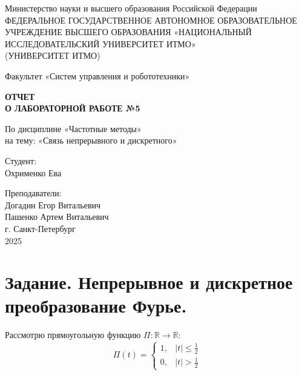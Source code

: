 \documentclass[a4paper,12pt]{article}
\begin{document}
	\begin{titlepage}
		\centering
		\vspace*{1cm}
		
		{\large Министерство науки и высшего образования Российской Федерации}\\
		{\large ФЕДЕРАЛЬНОЕ ГОСУДАРСТВЕННОЕ АВТОНОМНОЕ ОБРАЗОВАТЕЛЬНОЕ УЧРЕЖДЕНИЕ ВЫСШЕГО ОБРАЗОВАНИЯ «НАЦИОНАЛЬНЫЙ ИССЛЕДОВАТЕЛЬСКИЙ УНИВЕРСИТЕТ ИТМО»}\\
		{\large (УНИВЕРСИТЕТ ИТМО)}\\
		
		\vspace{2cm}
		
		{\large Факультет «Систем управления и робототехники»}\\
		
		\vspace{3cm}
		
		\textbf{{\Huge ОТЧЕТ}\\
			{\Huge О ЛАБОРАТОРНОЙ РАБОТЕ №5}}\\
		
		\vspace{1cm}
		
		{\LARGE По дисциплине «Частотные методы»}\\
		{\LARGE на тему: «Связь непрерывного и дискретного»}\\
		
		\vspace{3cm}
		
		{\Large Студент:}\\
		Охрименко Ева
		
		\vspace{2cm}
		
		{\Large Преподаватели:}\\
		Догадин Егор Витальевич\\
		Пашенко Артем Витальевич\\
		
		\vspace{3cm}
		{\large г. Санкт-Петербург}\\
		{\large 2025}
		
	\end{titlepage}
	\newpage
	\tableofcontents
	\newpage
	
	\section{Задание. Непрерывное и дискретное преобразование Фурье.}
	
	Рассмотрю прямоугольную функцию $\Pi: \mathbb{R} \to \mathbb{R}$:
	\[
	\Pi(t) = 
	\begin{cases}
	1, & |t| \leq \frac{1}{2} \\
	0, & |t| > \frac{1}{2}
	\end{cases}
	\]
	
\end{document}
